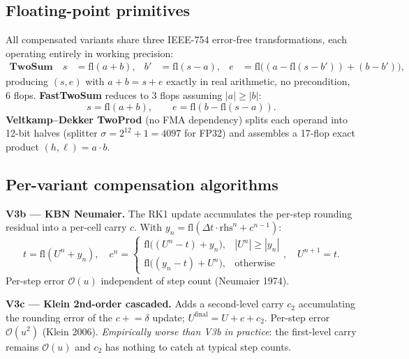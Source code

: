 \documentclass[11pt,a4paper]{article}
\begin{document}
\subsection{Floating-point primitives}
\label{sec:fp-primitives}

All compensated variants share three IEEE-754 error-free transformations,
each operating entirely in working precision:
\begin{align}
\textbf{TwoSum}\quad s &= \mathrm{fl}(a + b), &
b' &= \mathrm{fl}(s - a), &
e &= \mathrm{fl}\bigl((a - \mathrm{fl}(s-b')) + (b - b')\bigr),
\end{align}
producing \((s, e)\) with \(a + b = s + e\) exactly in real
arithmetic, no precondition, 6 flops. \textbf{FastTwoSum} reduces to
3 flops assuming \(|a| \ge |b|\):
\begin{equation}
s = \mathrm{fl}(a + b), \qquad e = \mathrm{fl}(b - \mathrm{fl}(s - a)).
\end{equation}
\textbf{Veltkamp--Dekker TwoProd} (no FMA dependency) splits each
operand into 12-bit halves (splitter \(\sigma = 2^{12} + 1 = 4097\) for
FP32) and assembles a 17-flop exact product
\((h, \ell) = a \cdot b\).

\subsection{Per-variant compensation algorithms}
\label{sec:variants-algo}

\textbf{V3b --- KBN Neumaier.}  The RK1 update accumulates the
per-step rounding residual into a per-cell carry \(c\). With
\(y_n = \mathrm{fl}(\Delta t \cdot \mathrm{rhs}^n + c^{n-1})\):
\begin{equation}
t = \mathrm{fl}(U^n + y_n),
\quad
c^n = \begin{cases}
\mathrm{fl}\bigl((U^n - t) + y_n\bigr), & |U^n|\ge|y_n|\\
\mathrm{fl}\bigl((y_n - t) + U^n\bigr), & \text{otherwise}
\end{cases},
\quad
U^{n+1} = t.
\end{equation}
Per-step error \(\mathcal{O}(u)\) independent of step count
(Neumaier 1974).

\textbf{V3c --- Klein 2nd-order cascaded.}  Adds a second-level carry
\(c_2\) accumulating the rounding error of the \(c \mathrel{+}= \delta\)
update; \(U^{\mathrm{final}} = U + c + c_2\). Per-step error
\(\mathcal{O}(u^2)\) (Klein 2006). \emph{Empirically worse than V3b
in practice}: the first-level carry remains \(\mathcal{O}(u)\) and
\(c_2\) has nothing to catch at typical step counts.
\end{document}
